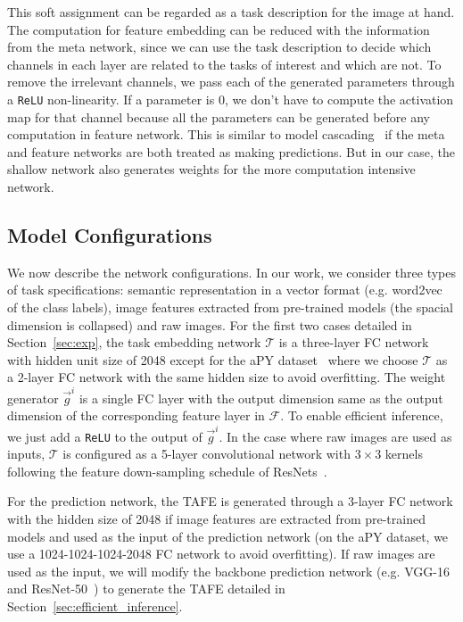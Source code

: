 \documentclass[10pt,twocolumn,letterpaper]{article}
\begin{document}
This soft assignment can be regarded as a task description for the image at hand. 
The computation for feature embedding can be reduced with the information from the meta network, since we can use the task description to decide which channels in each layer are related to the tasks of interest and which are not. To remove the irrelevant channels, we pass each of the generated parameters through a {\tt ReLU} non-linearity.
If a parameter is 0, we don't have to compute the activation map for that channel because all the parameters can be generated before any computation in feature network. 
This is similar to model cascading~\cite{wang2017idk} if the meta and feature networks are both treated as making predictions. 
But in our case, the shallow network also generates weights for the more computation intensive network.

\subsection{Model Configurations}
We now describe the network configurations. In
our work, we consider three types of task specifications: semantic representation
in a vector format (e.g. word2vec~\cite{mikolov2013efficient} of the class labels),
image features extracted from pre-trained models (the spacial dimension is collapsed) and raw images. For the first two cases detailed in Section~\ref{sec:exp},
the task embedding network $\mathcal{T}$ is a three-layer FC network with hidden unit size of 2048 except 
for the aPY dataset~\cite{farhadi2009describing} where we choose  $\mathcal{T}$ as a 2-layer FC network with the same hidden size to avoid overfitting. The weight generator $
\Vec{g}^i$ is a single FC layer with the output dimension same as the output dimension
of the corresponding feature layer in $\mathcal{F}$. To enable efficient inference,
we just add a \texttt{ReLU} to the output of $\Vec{g}^i$. In the case where raw
images are used as inputs, $\mathcal{T}$ is configured as a 5-layer convolutional
network with $3\times3$ kernels following the feature down-sampling schedule of
ResNets~\cite{he2016deep}. 

For the prediction network, the TAFE is generated through a 3-layer FC
network with the hidden size of 2048 if image features are extracted from pre-trained
models and used as the input of the prediction network (on the aPY dataset, 
we use a 1024-1024-1024-2048 FC network to avoid overfitting). If raw images 
are used as the input, we will modify the backbone prediction network (e.g. VGG-16~\cite{simonyan2014very} and ResNet-50~\cite{he2016deep}) to generate the TAFE detailed in Section~\ref{sec:efficient_inference}.
\end{document}
